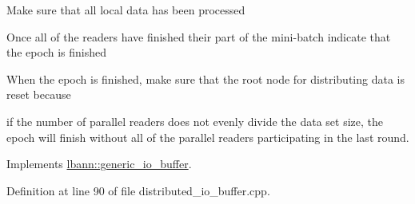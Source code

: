 Make sure that all local data has been processed

Once all of the readers have finished their part of the mini-\/batch indicate that the epoch is finished

When the epoch is finished, make sure that the root node for distributing data is reset because

if the number of parallel readers does not evenly divide the data set size, the epoch will finish without all of the parallel readers participating in the last round. 

Implements \hyperlink{classlbann_1_1generic__io__buffer_a9a038d40aec50dbc24c0abe21ad0c0a9}{lbann\+::generic\+\_\+io\+\_\+buffer}.



Definition at line 90 of file distributed\+\_\+io\+\_\+buffer.\+cpp.


